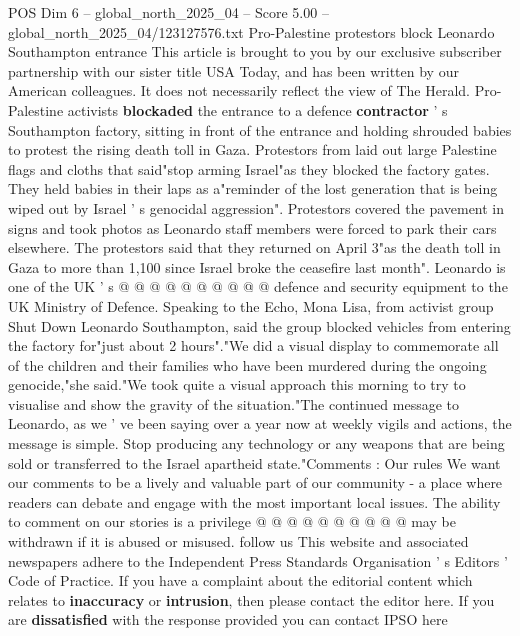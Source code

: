 \begin{textsample}{POS Dim 6 – global\_north\_2025\_04 – Score 5.00 – global\_north\_2025\_04/123127576.txt}  \label{ex:f6_pos_208}
Pro-Palestine protestors block Leonardo Southampton entrance This article is brought to you by our exclusive subscriber partnership with our sister title USA Today, and has been written by our American colleagues.
It does not necessarily reflect the view of The Herald.
Pro-Palestine activists \textbf{blockaded} the entrance to a defence \textbf{contractor} ' s Southampton factory, sitting in front of the entrance and holding shrouded babies to protest the rising death toll in Gaza.
Protestors from laid out large Palestine flags and cloths that said"stop arming Israel"as they blocked the factory gates.
They held babies in their laps as a"reminder of the lost generation that is being wiped out by Israel ' s genocidal aggression".
Protestors covered the pavement in signs and took photos as Leonardo staff members were forced to park their cars elsewhere.
The protestors said that they returned on April 3"as the death toll in Gaza to more than 1,100 since Israel broke the ceasefire last month".
Leonardo is one of the UK ' s @ @ @ @ @ @ @ @ @ @ defence and security equipment to the UK Ministry of Defence.
Speaking to the Echo, Mona Lisa, from activist group Shut Down Leonardo Southampton, said the group blocked vehicles from entering the factory for"just about 2 hours"."We did a visual display to commemorate all of the children and their families who have been murdered during the ongoing genocide,"she said."We took quite a visual approach this morning to try to visualise and show the gravity of the situation."The continued message to Leonardo, as we ' ve been saying over a year now at weekly vigils and actions, the message is simple.
Stop producing any technology or any weapons that are being sold or transferred to the Israel apartheid state."Comments : Our rules We want our comments to be a lively and valuable part of our community - a place where readers can debate and engage with the most important local issues.
The ability to comment on our stories is a privilege @ @ @ @ @ @ @ @ @ @ may be withdrawn if it is abused or misused. follow us This website and associated newspapers adhere to the Independent Press Standards Organisation ' s Editors ' Code of Practice.
If you have a complaint about the editorial content which relates to \textbf{inaccuracy} or \textbf{intrusion}, then please contact the editor here.
If you are \textbf{dissatisfied} with the response provided you can contact IPSO here

\end{textsample}
